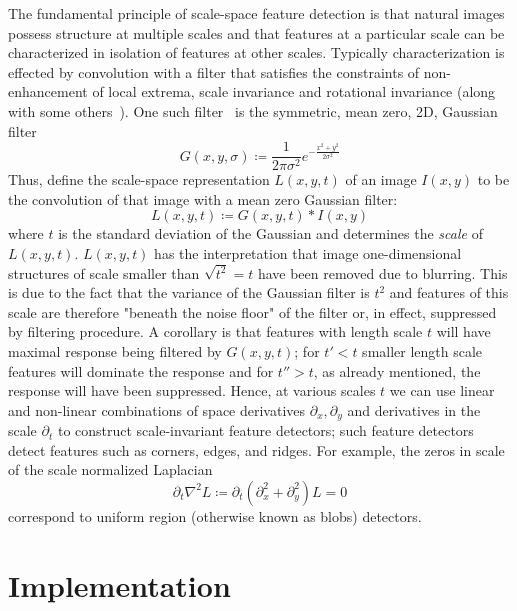 \documentclass[sigconf,nonacm]{acmart}
\begin{document}
The fundamental principle of scale-space feature detection is that natural images possess structure at multiple scales and that features at a particular scale can be characterized in isolation of features at other scales.
Typically characterization is effected by convolution with a filter that satisfies the constraints of non-enhancement of local extrema, scale invariance and rotational invariance (along with some others~\cite{}).
One such filter~\cite{} is the symmetric, mean zero, 2D, Gaussian filter 
$$
G(x,y,\sigma) \coloneqq \frac{1}{2\pi \sigma^2} e^{-\frac{x^2 +y ^2}{2\sigma^2}}
$$
Thus, define the scale-space representation $L(x,y, t)$ of an image $I(x,y)$ to be the convolution of that image with a mean zero Gaussian filter:
$$
L(x,y,t) \coloneqq G(x,y,t) * I(x,y)
$$
where $t$ is the standard deviation of the Gaussian and determines the \textit{scale} of $L(x,y,t)$.
$L(x,y,t)$ has the interpretation that image one-dimensional structures of scale smaller than $\sqrt{t^2} = t$ have been removed due to blurring.
This is due to the fact that the variance of the Gaussian filter is $t^2$ and features of this scale are therefore "beneath the noise floor" of the filter or, in effect, suppressed by filtering procedure.
A corollary is that features with length scale $t$ will have maximal response being filtered by $G(x,y,t)$; for $t' < t$ smaller length scale features will dominate the response and for $t'' > t$, as already mentioned, the response will have been suppressed. 
Hence, at various scales $t$ we can use linear and non-linear combinations of space derivatives $\partial_x, \partial_y$ and derivatives in the scale $\partial_t$ to construct scale-invariant feature detectors; such feature detectors detect features such as corners, edges, and ridges.
For example, the zeros in scale of the scale normalized Laplacian 
\begin{equation}
    \partial_t \nabla^2 L \coloneqq \partial_t \left( \partial_x^2 + \partial _y^2\right) L = 0
    \label{eqn:blobdetector}
\end{equation}
correspond to uniform region (otherwise known as blobs) detectors.

\section{Implementation}\label{sec:implementation}
\end{document}
